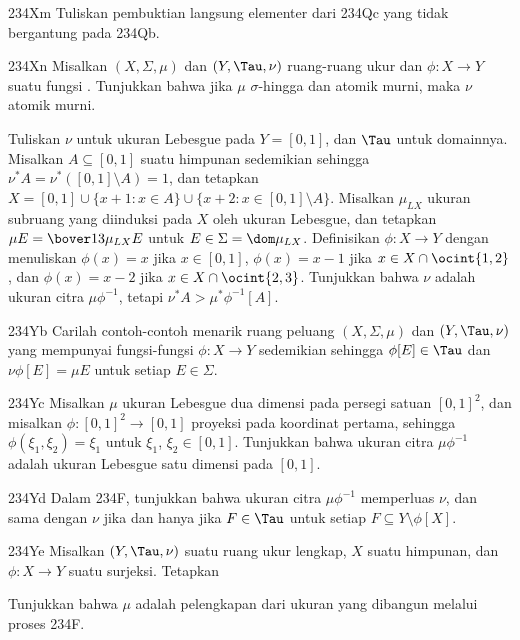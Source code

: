 {\spheader 234Xm
 Tuliskan pembuktian langsung elementer dari 234Qc yang tidak bergantung
pada 234Qb.

\spheader 234Xn Misalkan $(X,\Sigma,\mu)$ dan
$(Y,\Tau,\nu)$ ruang-ruang ukur dan $\phi:X\to Y$ suatu fungsi \imp.
Tunjukkan bahwa jika $\mu$ $\sigma$-hingga dan atomik murni, maka
$\nu$ atomik murni.

Tuliskan $\nu$ untuk ukuran Lebesgue pada $Y=[0,1]$, dan $\Tau$ untuk
domainnya. Misalkan $A\subseteq[0,1]$ suatu himpunan sedemikian sehingga
$\nu^*A=\nu^*([0,1]\setminus A)=1$, dan tetapkan
$X=[0,1]\cup\{x+1:x\in A\}\cup\{x+2:x\in[0,1]\setminus A\}$. Misalkan
$\mu_{LX}$ ukuran subruang yang diinduksi pada $X$ oleh ukuran Lebesgue,
dan tetapkan $\mu E=\bover13\mu_{LX}E$ untuk
$E\in\Sigma=\dom\mu_{LX}$. Definisikan $\phi:X\to Y$ dengan menuliskan
$\phi(x)=x$ jika $x\in[0,1]$, $\phi(x)=x-1$ jika
$x\in X\cap\ocint{1,2}$, dan $\phi(x)=x-2$ jika
$x\in X\cap\ocint{2,3}$. Tunjukkan bahwa $\nu$ adalah ukuran citra
$\mu\phi^{-1}$, tetapi $\nu^*A>\mu^*\phi^{-1}[A]$.

\spheader 234Yb
Carilah contoh-contoh menarik ruang peluang $(X,\Sigma,\mu)$ dan
$(Y,\Tau,\nu)$ yang mempunyai fungsi-fungsi $\phi:X\to Y$ sedemikian
sehingga $\phi[E]\in\Tau$ dan $\nu\phi[E]=\mu E$ untuk setiap
$E\in\Sigma$. 

\spheader 234Yc
Misalkan $\mu$ ukuran Lebesgue dua dimensi pada persegi satuan
$[0,1]^2$, dan misalkan $\phi:[0,1]^2\to[0,1]$ proyeksi pada koordinat
pertama, sehingga $\phi(\xi_1,\xi_2)=\xi_1$ untuk
$\xi_1$, $\xi_2\in[0,1]$. Tunjukkan bahwa ukuran citra
$\mu\phi^{-1}$ adalah ukuran Lebesgue satu dimensi pada $[0,1]$.

\spheader 234Yd
Dalam 234F, tunjukkan bahwa ukuran citra $\mu\phi^{-1}$ memperluas
$\nu$, dan sama dengan $\nu$ jika dan hanya jika $F\in\Tau$ untuk
setiap $F\subseteq Y\setminus\phi[X]$.

\spheader 234Ye
 Misalkan $(Y,\Tau,\nu)$ suatu ruang ukur lengkap, $X$ suatu himpunan,
dan $\phi:X\to Y$ suatu surjeksi. Tetapkan


\noindent Tunjukkan bahwa $\mu$ adalah pelengkapan dari ukuran yang
dibangun melalui proses 234F.

}
